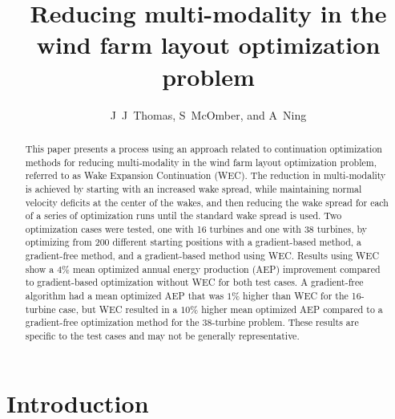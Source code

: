 \documentclass[a4paper]{jpconf}
\begin{document}
\title{Reducing multi-modality in the wind farm layout optimization problem}

\author{J~J~Thomas, S~McOmber, and A~Ning}
\address{Department of Mechanical Engineering,
Brigham Young University, Provo, Utah, USA}

\begin{abstract}
	This paper presents a process using an approach related to  continuation optimization methods for reducing multi-modality in the wind farm layout optimization problem, referred to as Wake Expansion Continuation (WEC). The reduction in multi-modality is achieved by starting with an increased wake spread, while maintaining normal velocity deficits at the center of the wakes, and then reducing the wake spread for each of a series of optimization runs until the standard wake spread is used. Two optimization cases were tested, one with 16 turbines and one with 38 turbines, by optimizing from 200 different starting positions with a gradient-based method, a gradient-free method, and a gradient-based method using WEC. Results using WEC show a $4\%$ mean optimized annual energy production (AEP) improvement compared to gradient-based optimization without WEC for both test cases. A gradient-free algorithm had a mean optimized AEP that was $1\%$ higher than WEC for the 16-turbine case, but WEC resulted in a $10\%$ higher mean optimized AEP compared to a gradient-free optimization method for the 38-turbine problem. These results are specific to the test cases and may not be generally representative.
\end{abstract}

\section{Introduction}
%
%
%
\end{document}

